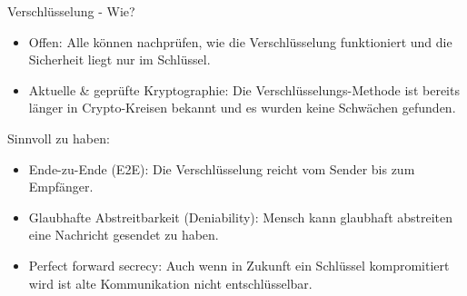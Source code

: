 \documentclass{beamer}
\begin{document}
\begin{frame} {Verschlüsselung - Wie?}
	\begin{itemize}
		\item Offen: Alle können nachprüfen, wie die Verschlüsselung funktioniert und die Sicherheit liegt nur im Schlüssel.
                \item Aktuelle \& geprüfte Kryptographie: Die Verschlüsselungs-Methode ist bereits länger in Crypto-Kreisen bekannt und es wurden keine Schwächen gefunden.
	\end{itemize}
	
        \pause
	Sinnvoll zu haben:
	\begin{itemize}
            \item Ende-zu-Ende (E2E): Die Verschlüsselung reicht vom Sender bis zum Empfänger.
            \item Glaubhafte Abstreitbarkeit (Deniability): Mensch kann glaubhaft abstreiten eine Nachricht gesendet zu haben.
	    \item Perfect forward secrecy: Auch wenn in Zukunft ein Schlüssel kompromitiert wird ist alte Kommunikation nicht entschlüsselbar.
	\end{itemize}
\end{frame}
\end{document}
